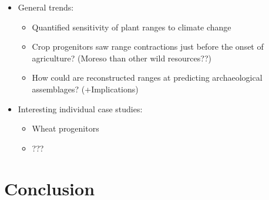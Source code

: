 \documentclass[
  authoryear,
  review]{elsarticle}
\providecommand{\tightlist}{%
  \setlength{\itemsep}{0pt}\setlength{\parskip}{0pt}}\usepackage{longtable,booktabs,array}
\begin{document}
\begin{itemize}
\tightlist
\item
  General trends:

  \begin{itemize}
  \tightlist
  \item
    Quantified sensitivity of plant ranges to climate change
  \item
    Crop progenitors saw range contractions just before the onset of
    agriculture? (Moreso than other wild resources??)
  \item
    How could are reconstructed ranges at predicting archaeological
    assemblages? (+Implications)
  \end{itemize}
\item
  Interesting individual case studies:

  \begin{itemize}
  \tightlist
  \item
    Wheat progenitors
  \item
    ???
  \end{itemize}
\end{itemize}

\section{Conclusion}\label{conclusion}


\renewcommand\refname{References}
  
\end{document}

